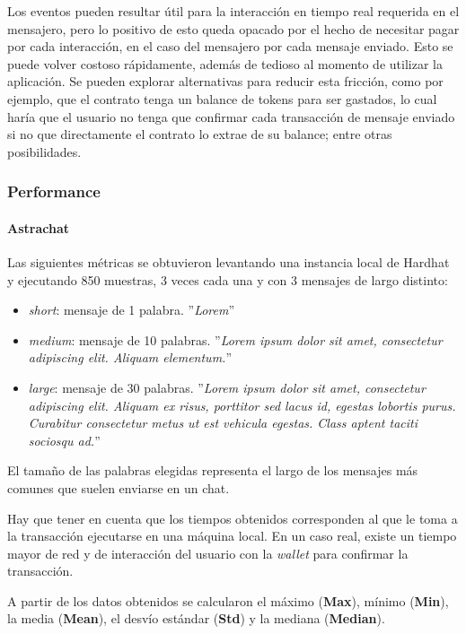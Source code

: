 Los eventos pueden resultar útil para la interacción en tiempo real requerida en el mensajero, pero lo positivo de esto queda opacado por el hecho de necesitar pagar por cada interacción, en el caso del mensajero por cada mensaje enviado. Esto se puede volver costoso rápidamente, además de tedioso al momento de utilizar la aplicación. Se pueden explorar alternativas para reducir esta fricción, como por ejemplo, que el contrato tenga un balance de tokens para ser gastados, lo cual haría que el usuario no tenga que confirmar cada transacción de mensaje enviado si no que directamente el contrato lo extrae de su balance; entre otras posibilidades.

\subsubsection{Performance\label{performance-blockchain}}

\paragraph{Astrachat}

Las siguientes métricas se obtuvieron levantando una instancia local de Hardhat \cite{hardhat} y ejecutando 850 muestras, 3 veces cada una y con 3 mensajes de largo distinto:

\begin{itemize}
    \item \textit{short}: mensaje de 1 palabra. ''\textit{Lorem}''
    \item \textit{medium}: mensaje de 10 palabras. ''\textit{Lorem ipsum dolor sit amet, consectetur adipiscing elit. Aliquam elementum.}''
    \item \textit{large}: mensaje de 30 palabras. ''\textit{Lorem ipsum dolor sit amet, consectetur adipiscing elit. Aliquam ex risus, porttitor sed lacus id, egestas lobortis purus. Curabitur consectetur metus ut est vehicula egestas. Class aptent taciti sociosqu ad.}''
\end{itemize}

El tamaño de las palabras elegidas representa el largo de los mensajes más comunes que suelen enviarse en un chat.

Hay que tener en cuenta que los tiempos obtenidos corresponden al que le toma a la transacción ejecutarse en una máquina local. En un caso real, existe un tiempo mayor de red y de interacción del usuario con la \textit{wallet} para confirmar la transacción.

A partir de los datos obtenidos se calcularon el máximo (\textbf{Max}), mínimo (\textbf{Min}), la media (\textbf{Mean}), el desvío estándar (\textbf{Std}) y la mediana (\textbf{Median}).

